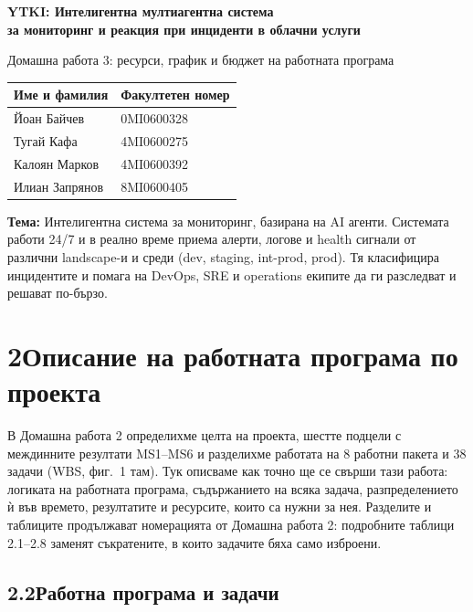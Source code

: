 \documentclass[11pt,a4paper]{article}
\begin{document}
\begin{center}
{\Large\bfseries YTKI: Интелигентна мултиагентна система\\ за мониторинг и реакция при инциденти в облачни услуги\par}
\vspace{4pt}
{\small Домашна работа 3: ресурси, график и бюджет на работната програма\par}
\vspace{8pt}
\begin{tabular}{ll}
\toprule
\textbf{Име и фамилия} & \textbf{Факултетен номер}\\
\midrule
Йоан Байчев & 0MI0600328\\
Тугай Кафа & 4MI0600275\\
Калоян Марков & 4MI0600392\\
Илиан Запрянов & 8MI0600405\\
\bottomrule
\end{tabular}
\end{center}

\textbf{Тема:} Интелигентна система за мониторинг, базирана на AI агенти. Системата работи 24/7 и в реално време приема алерти, логове и health сигнали от различни landscape-и и среди (dev, staging, int-prod, prod). Тя класифицира инцидентите и помага на DevOps, SRE и operations екипите да ги разследват и решават по-бързо.


\section*{2\quad Описание на работната програма по проекта}
В Домашна работа 2 определихме целта на проекта, шестте подцели с междинните резултати MS1--MS6 и разделихме работата на 8 работни пакета и 38 задачи (WBS, фиг.~1 там). Тук описваме как точно ще се свърши тази работа: логиката на работната програма, съдържанието на всяка задача, разпределението ѝ във времето, резултатите и ресурсите, които са нужни за нея. Разделите и таблиците продължават номерацията от Домашна работа 2: подробните таблици 2.1--2.8 заменят съкратените, в които задачите бяха само изброени.

\subsection*{2.2\quad Работна програма и задачи}
\end{document}

